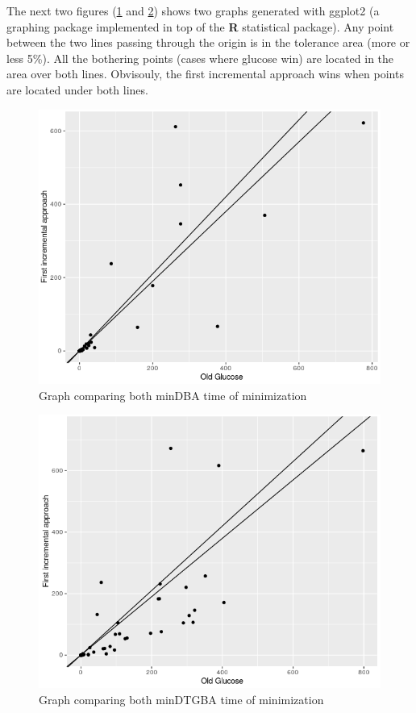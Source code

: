 The next two figures (\ref{fig:glu_vs_incr1_dba} and \ref{fig:glu_vs_incr1_dtgba}) shows two graphs generated
with ggplot2 \cite{23} (a graphing package implemented in top of the \textbf{R} statistical package). Any
point between the two lines passing through the origin is in the tolerance area (more or less 5\%). All the
bothering points (cases where glucose win) are located in the area over both lines. Obvisouly, the
first incremental approach wins when points are located under both lines.

\begin{figure}[H]
 \centering
 \includegraphics[scale=0.6]{img/glu_vs_incr1_dba.png}
 \caption{Graph comparing both minDBA time of minimization}
 \label{fig:glu_vs_incr1_dba}
\end{figure}

\begin{figure}[H]
 \centering
 \includegraphics[scale=0.6]{img/glu_vs_incr1_dtgba.png}
 \caption{Graph comparing both minDTGBA time of minimization}
 \label{fig:glu_vs_incr1_dtgba}
\end{figure}

